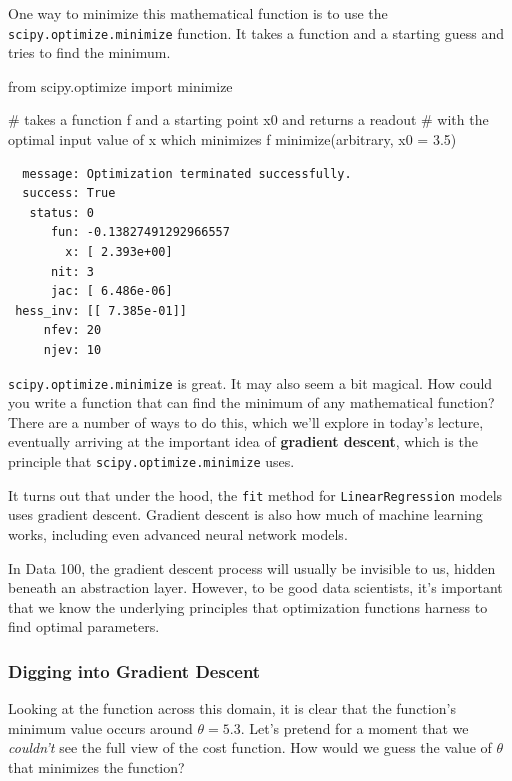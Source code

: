 \documentclass[
  letterpaper,
  DIV=11,
  numbers=noendperiod]{scrreprt}
\newenvironment{Shaded}{\begin{snugshade}}{\end{snugshade}}
\newcommand{\CommentTok}[1]{\textcolor[rgb]{0.37,0.37,0.37}{#1}}
\newcommand{\FloatTok}[1]{\textcolor[rgb]{0.68,0.00,0.00}{#1}}
\newcommand{\ImportTok}[1]{\textcolor[rgb]{0.00,0.46,0.62}{#1}}
\newcommand{\NormalTok}[1]{\textcolor[rgb]{0.00,0.23,0.31}{#1}}
\newcommand{\OperatorTok}[1]{\textcolor[rgb]{0.37,0.37,0.37}{#1}}
\begin{document}
One way to minimize this mathematical function is to use the
\texttt{scipy.optimize.minimize} function. It takes a function and a
starting guess and tries to find the minimum.

\begin{Shaded}
\begin{Highlighting}[]
\ImportTok{from}\NormalTok{ scipy.optimize }\ImportTok{import}\NormalTok{ minimize}

\CommentTok{\# takes a function f and a starting point x0 and returns a readout }
\CommentTok{\# with the optimal input value of x which minimizes f}
\NormalTok{minimize(arbitrary, x0 }\OperatorTok{=} \FloatTok{3.5}\NormalTok{)}
\end{Highlighting}
\end{Shaded}

\begin{verbatim}
  message: Optimization terminated successfully.
  success: True
   status: 0
      fun: -0.13827491292966557
        x: [ 2.393e+00]
      nit: 3
      jac: [ 6.486e-06]
 hess_inv: [[ 7.385e-01]]
     nfev: 20
     njev: 10
\end{verbatim}

\texttt{scipy.optimize.minimize} is great. It may also seem a bit
magical. How could you write a function that can find the minimum of any
mathematical function? There are a number of ways to do this, which
we'll explore in today's lecture, eventually arriving at the important
idea of \textbf{gradient descent}, which is the principle that
\texttt{scipy.optimize.minimize} uses.

It turns out that under the hood, the \texttt{fit} method for
\texttt{LinearRegression} models uses gradient descent. Gradient descent
is also how much of machine learning works, including even advanced
neural network models.

In Data 100, the gradient descent process will usually be invisible to
us, hidden beneath an abstraction layer. However, to be good data
scientists, it's important that we know the underlying principles that
optimization functions harness to find optimal parameters.

\subsubsection{Digging into Gradient
Descent}\label{digging-into-gradient-descent}

Looking at the function across this domain, it is clear that the
function's minimum value occurs around \(\theta = 5.3\). Let's pretend
for a moment that we \emph{couldn't} see the full view of the cost
function. How would we guess the value of \(\theta\) that minimizes the
function?
\end{document}
